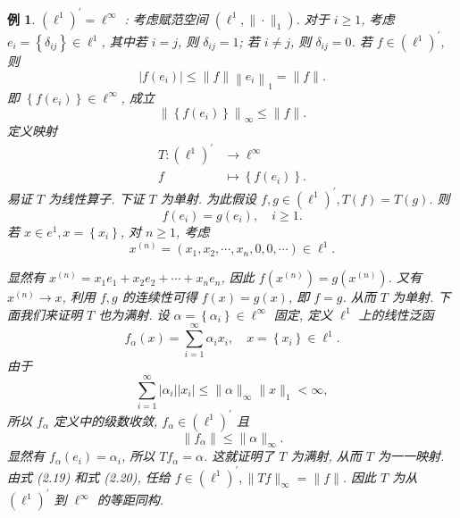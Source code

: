 \documentclass[openany]{ctexbook}
\theoremstyle{kaiti}
\theoremstyle{normal}
\newtheorem{example}{例}[section]
\begin{document}
\begin{example}
$\left(\ell^1\right)^{\prime}=\ell^{\infty}$ : 考虑赋范空间 $\left(\ell^1,\|\cdot\|_1\right)$. 对于 $i \geqslant 1$, 考虑 $e_{i}=\left\{\delta_{i j}\right\} \in \ell^1$, 其中若 $i=j$, 则 $\delta_{i j}=1$; 若 $i \neq j$, 则 $\delta_{i j}=0$. 若 $f \in\left(\ell^1\right)^{\prime}$, 则
$$
\left|f\left(e_{i}\right)\right| \leqslant\|f\|\left\|e_{i}\right\|_1=\|f\|.
$$
即 $\left\{f\left(e_{i}\right)\right\} \in \ell^{\infty}$, 成立
\begin{equation}
  \left\|\left\{f\left(e_{i}\right)\right\}\right\|_{\infty} \leqslant\|f\|.
\end{equation}
定义映射
$$
\begin{aligned}
T:\left(\ell^1\right)^{\prime} & \rightarrow \ell^{\infty} \\
f & \mapsto\left\{f\left(e_{i}\right)\right\}.
\end{aligned}
$$
易证 $T$ 为线性算子. 下证 $T$ 为单射. 为此假设 $f, g \in\left(\ell^1\right)^{\prime}, T(f)=T(g)$. 则
$$
f\left(e_{i}\right)=g\left(e_{i}\right), \quad i \geqslant 1.
$$
若 $x \in e^1, x=\left\{x_{i}\right\}$, 对 $n \geqslant 1$, 考虑
$$
x^{(n)}=\left(x_1, x_2, \cdots, x_n, 0,0, \cdots\right) \in \ell^1.
$$

显然有 $x^{(n)}=x_1 e_1+x_2 e_2+\cdots+x_n e_n$, 因此 $f\left(x^{(n)}\right)=g\left(x^{(n)}\right)$. 又有 $x^{(n)} \rightarrow x$, 利用 $f, g$ 的连续性可得 $f(x)=g(x)$, 即 $f=g$. 从而 $T$ 为单射. 下面我们来证明 $T$ 也为满射. 设 $\alpha=\left\{\alpha_{i}\right\} \in \ell^{\infty}$ 固定, 定义 $\ell^1$ 上的线性泛函
$$
f_{\alpha}(x)=\sum_{i=1}^{\infty} \alpha_{i} x_{i}, \quad x=\left\{x_{i}\right\} \in \ell^1.
$$
由于
$$
\sum_{i=1}^{\infty}\left|\alpha_{i}\right|\left|x_{i}\right| \leqslant\|\alpha\|_{\infty}\|x\|_1<\infty,
$$
所以 $f_{\alpha}$ 定义中的级数收敛, $f_{\alpha} \in\left(\ell^1\right)^{\prime}$ 且
\begin{equation}
  \left\|f_{\alpha}\right\| \leqslant\|\alpha\|_{\infty}.
\end{equation}
显然有 $f_{\alpha}\left(e_{i}\right)=\alpha_{i}$, 所以 $T f_{\alpha}=\alpha$. 这就证明了 $T$ 为满射, 从而 $T$ 为一一映射. 由式 (2.19) 和式 (2.20), 任给 $f \in\left(\ell^1\right)^{\prime},\|T f\|_{\infty}=\|f\|$. 因此 $T$ 为从 $\left(\ell^1\right)^{\prime}$ 到 $\ell^{\infty}$ 的等距同构.
\end{example}
\end{document}
